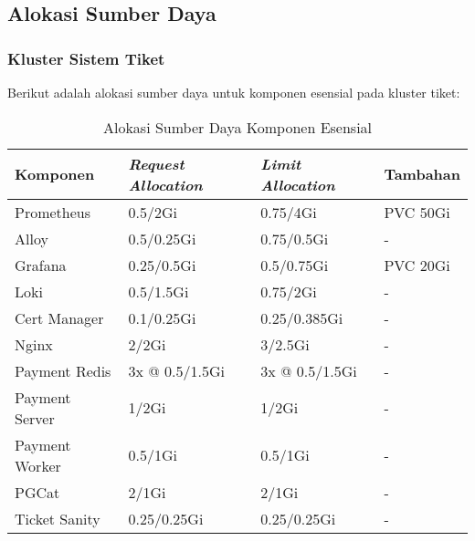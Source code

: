 \subsection{Alokasi Sumber Daya}

\subsubsection{Kluster Sistem Tiket}

Berikut adalah alokasi sumber daya untuk komponen esensial pada kluster tiket:

\begin{table}[htpb]
    \centering
    \caption{Alokasi Sumber Daya Komponen Esensial}
    \label{tab:resource_allocation}
    \begin{tabular}{|l|l|l|l|}
        \hline
        \textbf{Komponen} & \textbf{\textit{Request Allocation}} & \textbf{\textit{Limit Allocation}} & \textbf{Tambahan} \\ \hline
        Prometheus            & 0.5/2Gi                     & 0.75/4Gi                  & PVC 50Gi       \\ \hline
        Alloy                 & 0.5/0.25Gi                  & 0.75/0.5Gi                & -              \\ \hline
        Grafana               & 0.25/0.5Gi                  & 0.5/0.75Gi                & PVC 20Gi       \\ \hline
        Loki                  & 0.5/1.5Gi                   & 0.75/2Gi                  & -              \\ \hline
        Cert Manager          & 0.1/0.25Gi                  & 0.25/0.385Gi              & -              \\ \hline
        Nginx                 & 2/2Gi                       & 3/2.5Gi                   & -              \\ \hline
        Payment Redis         & 3x @ 0.5/1.5Gi              & 3x @ 0.5/1.5Gi            & -              \\ \hline
        Payment Server        & 1/2Gi                       & 1/2Gi                     & -              \\ \hline
        Payment Worker        & 0.5/1Gi                     & 0.5/1Gi                   & -              \\ \hline
        PGCat                 & 2/1Gi                       & 2/1Gi                     & -              \\ \hline
        Ticket Sanity         & 0.25/0.25Gi                 & 0.25/0.25Gi               & -              \\ \hline
    \end{tabular}
\end{table}

